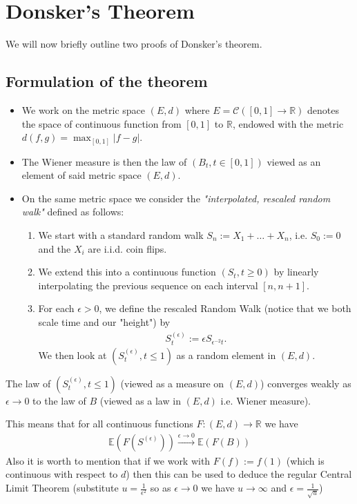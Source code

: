 \documentclass[../mainfile.tex]{subfiles}
\begin{document}
\section{Donsker's Theorem}
We will now briefly outline two proofs of Donsker's theorem.
\subsection{Formulation of the theorem}
\begin{itemize}
\item We work on the metric space $(E,d)$ where $E= \mathcal{C}([0,1] \to \mathbb{R})$ denotes the space of continuous function from $[0,1]$ to $\mathbb{R}$, endowed with the metric $d(f,g)= \max_{[0,1]} |f-g|$. 
\item The Wiener measure is then the law of $(B_t, t \in [0,1])$ viewed as an element of said metric space $(E,d)$. 
\item On the same metric space we consider the \textit{"interpolated, rescaled random walk"} defined as follows:
\begin{enumerate}
\item We start with a standard random walk $S_n:=X_1 + \dots + X_n$, i.e. $S_0:=0$ and the $X_i$ are i.i.d. coin flips. 
\item We extend this into a continuous function $(S_t, t \geq 0)$ by linearly interpolating the previous sequence on each interval $[n,n+1]$.
\item For each $\epsilon >0$, we define the rescaled Random Walk (notice that we both scale time and our "height") by
\begin{align*}
S_t^{(\epsilon)}:= \epsilon S_{\epsilon^{-2}t}.
\end{align*}
We then look at $(S_t^{(\epsilon)}, t \leq 1)$ as a random element in $(E,d)$. 
\end{enumerate}
\end{itemize}
\begin{thm} The law of $(S_t^{( \epsilon)}, t \leq 1)$ (viewed as a measure on $(E,d)$) converges weakly as $\epsilon \to 0$ to the law of $B$ (viewed as a law in $(E,d)$ i.e. Wiener measure).
\end{thm}
\begin{rem} This means that for all continuous functions $F: (E,d) \to \mathbb{R}$ we have 
\begin{align*}
\mathbb{E}(F(S^{(\epsilon)})) \overset{\epsilon \to 0}\longrightarrow \mathbb{E}(F(B))
\end{align*}
Also it is worth to mention that if we work with $F(f):=f(1)$ (which is continuous with respect to $d$) then this can be used to deduce the regular Central Limit Theorem (substitute $u= \frac{1}{\epsilon^2}$ so as $\epsilon \to 0$ we have $u \to \infty$ and $\epsilon = \frac{1}{\sqrt{u}}$) 
\end{rem}
\newpage
\end{document}
